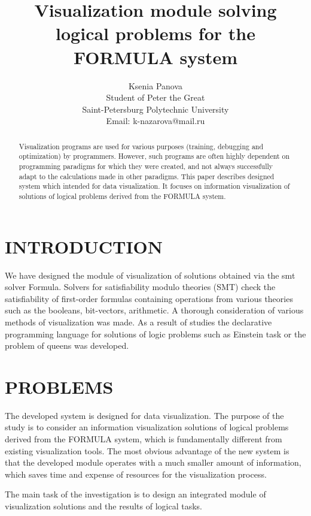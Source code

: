 \documentclass[a4paper, 10pt, conference]{ieeeconf}
\title{\LARGE \bf
Visualization module solving logical problems for the FORMULA system
}
\author{Ksenia Panova\\%
 \small Student of Peter the Great\\%
 \small Saint-Petersburg Polytechnic University\\%
 \small Email: k-nazarova@mail.ru}
\begin{document}
\maketitle
\thispagestyle{empty}
\pagestyle{plain}



\begin{abstract}
Visualization programs are used for various purposes (training, debugging and optimization) by programmers. However, such programs are often highly dependent on programming paradigms for which they were created, and not always successfully adapt to the calculations made in other paradigms. This paper describes designed system which intended for data visualization. It focuses on information visualization of solutions of logical problems derived from the FORMULA system.
\end{abstract}

\section{INTRODUCTION}

We have designed the module of visualization of solutions obtained via the smt solver Formula. Solvers for satisfiability modulo theories (SMT) check the satisfiability of first-order formulas containing operations from various theories such as the booleans, bit-vectors, arithmetic. A thorough consideration of various methods of visualization was made. As a result of studies the declarative programming language for solutions of logic problems such as Einstein task or the problem of queens was developed.

\section{PROBLEMS}
The developed system is designed for data visualization. The purpose of the study is to consider an information visualization solutions of logical problems derived from the FORMULA system, which is fundamentally different from existing visualization tools. The most obvious advantage of the new system is that the developed module operates with a much smaller amount of information, which saves time and expense of resources for the visualization process.

The main task of the investigation is to design an integrated module of visualization solutions and the results of logical tasks.
\end{document}
